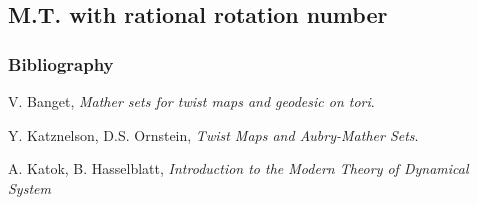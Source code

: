 \documentclass[12 pt]{beamer}
\begin{document}
\subsection{M.T. with rational rotation number}



\begin{frame}{}
    \frametitle{Bibliography}
    
    
    \begin{thebibliography}{ABC9999}

    \bibitem[R1]{}
    V. Banget,
    \textit{Mather sets for twist maps and geodesic on tori}.
	    
	\bibitem[R2]{}
    Y. Katznelson, D.S. Ornstein, 
    \textit{Twist Maps and Aubry-Mather Sets}.
    
    \bibitem[R3]{}
    A. Katok, B. Hasselblatt,
    \textit{Introduction to the Modern Theory of Dynamical System}
    
    \end{thebibliography}
        
\end{frame}
\end{document}
